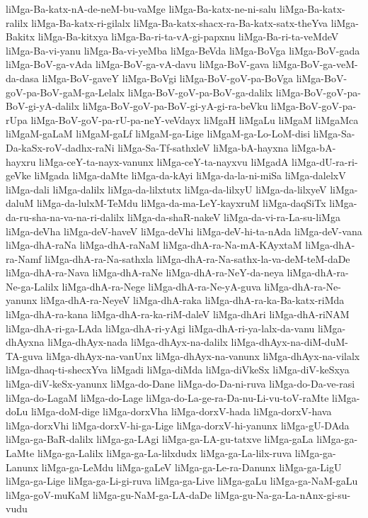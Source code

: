 {liMga-Ba-katx-nA-de-neM-bu-vaMge
liMga-Ba-katx-ne-ni-salu
liMga-Ba-katx-ralilx
liMga-Ba-katx-ri-gilalx
liMga-Ba-katx-shacx-ra-Ba-katx-satx-theYva
liMga-Bakitx
liMga-Ba-kitxya
liMga-Ba-ri-ta-vA-gi-papxnu
liMga-Ba-ri-ta-veMdeV
liMga-Ba-vi-yanu
liMga-Ba-vi-yeMba
liMga-BeVda
liMga-BoVga
liMga-BoV-gada
liMga-BoV-ga-vAda
liMga-BoV-ga-vA-davu
liMga-BoV-gava
liMga-BoV-ga-veM-da-dasa
liMga-BoV-gaveY
liMga-BoVgi
liMga-BoV-goV-pa-BoVga
liMga-BoV-goV-pa-BoV-gaM-ga-Lelalx
liMga-BoV-goV-pa-BoV-ga-dalilx
liMga-BoV-goV-pa-BoV-gi-yA-dalilx
liMga-BoV-goV-pa-BoV-gi-yA-gi-ra-beVku
liMga-BoV-goV-pa-rUpa
liMga-BoV-goV-pa-rU-pa-neY-veVdayx
liMgaH
liMgaLu
liMgaM
liMgaMca
liMgaM-gaLaM
liMgaM-gaLf
liMgaM-ga-Lige
liMgaM-ga-Lo-LoM-disi
liMga-Sa-Da-kaSx-roV-dadhx-raNi
liMga-Sa-Tf-sathxleV
liMga-bA-hayxna
liMga-bA-hayxru
liMga-ceY-ta-nayx-vanunx
liMga-ceY-ta-nayxvu
liMgadA
liMga-dU-ra-ri-geVke
liMgada
liMga-daMte
liMga-da-kAyi
liMga-da-la-ni-miSa
liMga-dalelxV
liMga-dali
liMga-dalilx
liMga-da-lilxtutx
liMga-da-lilxyU
liMga-da-lilxyeV
liMga-daluM
liMga-da-lulxM-TeMdu
liMga-da-ma-LeY-kayxruM
liMga-daqSiTx
liMga-da-ru-sha-na-va-na-ri-dalilx
liMga-da-shaR-nakeV
liMga-da-vi-ra-La-su-liMga
liMga-deVha
liMga-deV-haveV
liMga-deVhi
liMga-deV-hi-ta-nAda
liMga-deV-vana
liMga-dhA-raNa
liMga-dhA-raNaM
liMga-dhA-ra-Na-mA-KAyxtaM
liMga-dhA-ra-Namf
liMga-dhA-ra-Na-sathxla
liMga-dhA-ra-Na-sathx-la-va-deM-teM-daDe
liMga-dhA-ra-Nava
liMga-dhA-raNe
liMga-dhA-ra-NeY-da-neya
liMga-dhA-ra-Ne-ga-Lalilx
liMga-dhA-ra-Nege
liMga-dhA-ra-Ne-yA-guva
liMga-dhA-ra-Ne-yanunx
liMga-dhA-ra-NeyeV
liMga-dhA-raka
liMga-dhA-ra-ka-Ba-katx-riMda
liMga-dhA-ra-kana
liMga-dhA-ra-ka-riM-daleV
liMga-dhAri
liMga-dhA-riNAM
liMga-dhA-ri-ga-LAda
liMga-dhA-ri-yAgi
liMga-dhA-ri-ya-lalx-da-vanu
liMga-dhAyxna
liMga-dhAyx-nada
liMga-dhAyx-na-dalilx
liMga-dhAyx-na-diM-duM-TA-guva
liMga-dhAyx-na-vanUnx
liMga-dhAyx-na-vanunx
liMga-dhAyx-na-vilalx
liMga-dhaq-ti-shecxYva
liMgadi
liMga-diMda
liMga-diVkeSx
liMga-diV-keSxya
liMga-diV-keSx-yanunx
liMga-do-Dane
liMga-do-Da-ni-ruva
liMga-do-Da-ve-rasi
liMga-do-LagaM
liMga-do-Lage
liMga-do-La-ge-ra-Da-nu-Li-vu-toV-raMte
liMga-doLu
liMga-doM-dige
liMga-dorxVha
liMga-dorxV-hada
liMga-dorxV-hava
liMga-dorxVhi
liMga-dorxV-hi-ga-Lige
liMga-dorxV-hi-yanunx
liMga-gU-DAda
liMga-ga-BaR-dalilx
liMga-ga-LAgi
liMga-ga-LA-gu-tatxve
liMga-gaLa
liMga-ga-LaMte
liMga-ga-Lalilx
liMga-ga-La-lilxdudx
liMga-ga-La-lilx-ruva
liMga-ga-Lanunx
liMga-ga-LeMdu
liMga-gaLeV
liMga-ga-Le-ra-Danunx
liMga-ga-LigU
liMga-ga-Lige
liMga-ga-Li-gi-ruva
liMga-ga-Live
liMga-gaLu
liMga-ga-NaM-gaLu
liMga-goV-muKaM
liMga-gu-NaM-ga-LA-daDe
liMga-gu-Na-ga-La-nAnx-gi-su-vudu
}
